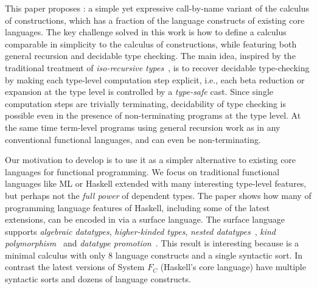 This paper proposes \name: a simple yet expressive call-by-name
variant of the calculus of constructions, which has a fraction of the
language constructs of existing core languages. The key challenge
solved in this work is how to define a calculus comparable in
simplicity to the calculus of constructions, while featuring both
general recursion and decidable type checking. The main idea, 
inspired by the traditional treatment of \emph{iso-recursive
  types}~\cite{tapl}, is to recover decidable type-checking by making each
type-level computation step explicit, i.e., each beta reduction or
expansion at the type level is controlled by a \emph{type-safe}
cast. Since single computation steps are trivially terminating, decidability
of type checking is possible even in the presence of non-terminating
programs at the type level.  At the same time term-level programs
using general recursion work as in any conventional functional
languages, and can even be non-terminating.

\begin{comment}
For example, if a type-level program requires two beta reductions to
reach normal form, then two casts are needed in the program. If a
non-terminating program is used at the type level, it is not possible
to cause non-termination in the type checker, because that would
require a program with an infinite number of casts. Therefore, since
single beta-steps are trivially terminating, decidability of type
checking is possible even in the presence of non-terminating programs
at the type level.  At the same time term-level programs using general
recursion work as in any conventional functional languages, and can
even be non-terminating.
\end{comment}

Our motivation to develop \name is to use it as a simpler alternative
to existing core languages for functional programming. We focus on traditional
functional languages like ML or Haskell extended with many interesting
type-level features, but perhaps not the \emph{full power} of
dependent types.  The paper shows how many of programming language
features of Haskell, including some of the latest extensions, can be
encoded in \name via a surface language. The surface
language supports \emph{algebraic datatypes}, \emph{higher-kinded
  types}, \emph{nested datatypes}~\cite{nesteddt}, \emph{kind
  polymorphism}~\cite{fc:pro} and \emph{datatype
  promotion}~\cite{fc:pro}.  This result is interesting because \name
is a minimal calculus with only 8 language constructs and a single
syntactic sort. In contrast the latest versions of System $F_{C}$
(Haskell's core language) have multiple syntactic sorts and dozens of
language constructs.

